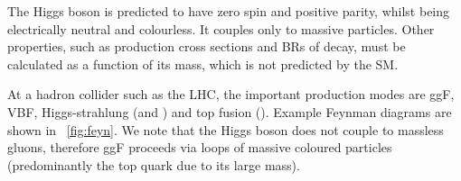 
The Higgs boson is predicted to have zero spin and positive parity, whilst being 
electrically neutral and colourless. It couples only to massive particles. Other 
properties, such as production cross sections and \acp{BR} of decay, must be calculated 
as a function of its mass, which is not predicted by the \ac{SM}.


At a hadron collider such as the \acs{LHC}, the important production modes are \ac{ggF},
\ac{VBF}, Higgs-strahlung (\WH and \ZH) and top fusion (\ttH). Example Feynman diagrams 
are shown in \Figure~\ref{fig:feyn}. We note that the Higgs boson does not couple to 
massless gluons, therefore \ac{ggF} proceeds via loops of massive coloured particles 
(predominantly the top quark due to its large mass). 

